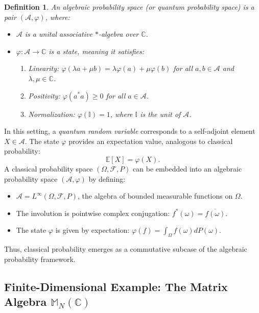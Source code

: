 \documentclass[a4paper,11pt]{article}
\newtheorem{definition}[theorem]{Definition}
\begin{document}
\begin{definition}
An \emph{algebraic probability space} (or \emph{quantum probability space}) is a pair $(\mathcal{A}, \varphi)$, where:
\begin{itemize}
    \item $\mathcal{A}$ is a unital associative $*$-algebra over $\mathbb{C}$.
    \item $\varphi: \mathcal{A} \to \mathbb{C}$ is a \emph{state}, meaning it satisfies:
    \begin{enumerate}
        \item \emph{Linearity:} $\varphi(\lambda a + \mu b) = \lambda \varphi(a) + \mu \varphi(b)$ for all $a, b \in \mathcal{A}$ and $\lambda, \mu \in \mathbb{C}$.
        \item \emph{Positivity:} $\varphi(a^*a) \geq 0$ for all $a \in \mathcal{A}$.
        \item \emph{Normalization:} $\varphi(\mathbb{I}) = 1$, where $\mathbb{I}$ is the unit of $\mathcal{A}$.
    \end{enumerate}
\end{itemize}
\end{definition}

In this setting, a \emph{quantum random variable} corresponds to a self-adjoint element $X \in \mathcal{A}$. The state $\varphi$ provides an expectation value, analogous to classical probability:
\begin{equation}
    \mathbb{E}[X] = \varphi(X).
\end{equation}
A classical probability space $(\Omega, \mathcal{F}, P)$ can be embedded into an algebraic probability space $(\mathcal{A}, \varphi)$ by defining:
\begin{itemize}
    \item $\mathcal{A} = L^\infty(\Omega, \mathcal{F}, P)$, the algebra of bounded measurable functions on $\Omega$.
    \item The involution is pointwise complex conjugation: $f^*(\omega) = \overline{f(\omega)}$.
    \item The state $\varphi$ is given by expectation: $\varphi(f) = \int_{\Omega} f(\omega) dP(\omega)$.
\end{itemize}
Thus, classical probability emerges as a commutative subcase of the algebraic probability framework.

\subsection{Finite-Dimensional Example: The Matrix Algebra \(\mathbb{M}_N(\mathbb{C})\)}
\end{document}
